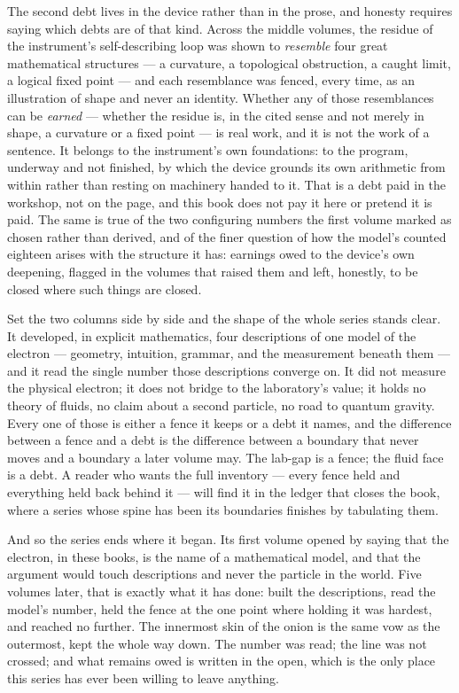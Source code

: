 The second debt lives in the device rather than in the prose, and honesty
requires saying which debts are of that kind. Across the middle volumes,
the residue of the instrument's self-describing loop was shown to
\emph{resemble} four great mathematical structures --- a curvature, a
topological obstruction, a caught limit, a logical fixed point --- and
each resemblance was fenced, every time, as an illustration of shape and
never an identity. Whether any of those resemblances can be \emph{earned}
--- whether the residue is, in the cited sense and not merely in shape, a
curvature or a fixed point --- is real work, and it is not the work of a
sentence. It belongs to the instrument's own foundations: to the program,
underway and not finished, by which the device grounds its own arithmetic
from within rather than resting on machinery handed to it. That is a debt
paid in the workshop, not on the page, and this book does not pay it here
or pretend it is paid. The same is true of the two configuring numbers the
first volume marked as chosen rather than derived, and of the finer
question of how the model's counted eighteen arises with the structure it
has: earnings owed to the device's own deepening, flagged in the volumes
that raised them and left, honestly, to be closed where such things are
closed.

Set the two columns side by side and the shape of the whole series stands
clear. It developed, in explicit mathematics, four descriptions of one
model of the electron --- geometry, intuition, grammar, and the
measurement beneath them --- and it read the single number those
descriptions converge on. It did not measure the physical electron; it
does not bridge to the laboratory's value; it holds no theory of fluids,
no claim about a second particle, no road to quantum gravity. Every one of
those is either a fence it keeps or a debt it names, and the difference
between a fence and a debt is the difference between a boundary that never
moves and a boundary a later volume may. The lab-gap is a fence; the fluid
face is a debt. A reader who wants the full inventory --- every fence held
and everything held back behind it --- will find it in the ledger that
closes the book, where a series whose spine has been its boundaries
finishes by tabulating them.

And so the series ends where it began. Its first volume opened by saying
that the electron, in these books, is the name of a mathematical model,
and that the argument would touch descriptions and never the particle in
the world. Five volumes later, that is exactly what it has done: built the
descriptions, read the model's number, held the fence at the one point
where holding it was hardest, and reached no further. The innermost skin
of the onion is the same vow as the outermost, kept the whole way down.
The number was read; the line was not crossed; and what remains owed is
written in the open, which is the only place this series has ever been
willing to leave anything.
